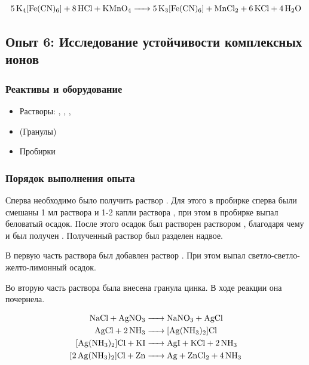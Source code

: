 \documentclass[a4paper, 12pt]{article}
\begin{document}
\begin{equation}
	\ce{5K4[Fe(CN)6] + 8HCl + KMnO4 -> 5K3[Fe(CN)6] + MnCl2 + 6KCl + 4H2O}
\end{equation}

\subsection{Опыт 6: Исследование устойчивости комплексных ионов}

\subsubsection{Реактивы и оборудование}

\begin{itemize}
	\item Растворы: , , , 
	\item {} (Гранулы)
	
	\item Пробирки
\end{itemize}

\subsubsection{Порядок выполнения опыта}

Сперва необходимо было получить раствор . Для этого в пробирке сперва были смешаны 1 мл раствора  и 1-2 капли раствора , при этом в пробирке выпал беловатый осадок. После этого осадок был растворен раствором , благодаря чему и был получен . Полученный раствор был разделен надвое.

В первую часть раствора был добавлен раствор . При этом выпал светло-светло-желто-лимонный осадок.

Во вторую часть раствора была внесена гранула цинка. В ходе реакции она почернела. %

\begin{align}
	\ce{NaCl + AgNO3 &-> NaNO3 + AgCl}\\
	\ce{AgCl + 2NH3 &-> [Ag(NH3)2]Cl}\\
	\ce{[Ag(NH3)2]Cl + KI &-> AgI + KCl + 2NH3} \\
	\ce{[2Ag(NH3)2]Cl + Zn &-> Ag + ZnCl2 + 4NH3}
\end{align}
\end{document}
